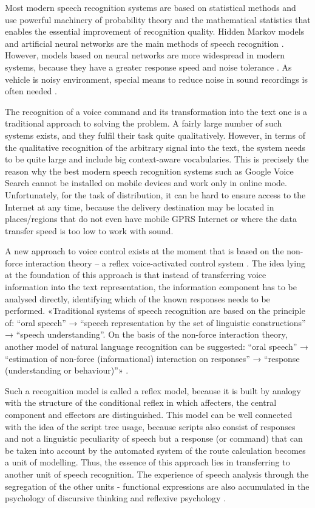 \documentclass[review,authoryear]{elsarticle}
\begin{document}
Most modern speech recognition systems are based on statistical methods and use powerful machinery of probability theory and the mathematical statistics that enables the essential improvement of recognition quality. Hidden Markov models and artificial neural networks are the main methods of speech recognition \citep{eng_Makovkin_2006,eng_Gefke_2012}. However, models based on neural networks are more widespread in modern systems, because they have a greater response speed and noise tolerance \citep{Hinton_2012}. As vehicle is noisy environment, special means to reduce noise in sound recordings is often needed \citep{Ayllon_2014}.

The recognition of a voice command and its transformation into the text one is a traditional approach to solving the problem. A fairly large number of such systems exists, and they fulfil their task quite qualitatively. However, in terms of the qualitative recognition of the arbitrary signal into the text, the system needs to be quite large and include big context-aware vocabularies. This is precisely the reason why the best modern speech recognition systems such as Google Voice Search cannot be installed on mobile devices and work only in online mode. Unfortunately, for the task of distribution, it can be hard to ensure access to the Internet at any time, because the delivery destination may be located in places/regions that do not even have mobile GPRS Internet or where the data transfer speed is too low to work with sound. 

A new approach to voice control exists at the moment that is based on the non-force interaction theory \citep{eng_Teslia_2010} – a reflex voice-activated control system  \citep{eng_Egorchenkov_2016}. The idea lying at the foundation of this approach is that instead of transferring voice information into the text representation, the information component has to be analysed directly, identifying which of the known responses needs to be performed. «Traditional systems of speech recognition are based on the principle of: “oral speech” → “speech representation by the set of linguistic constructions” → “speech understanding”. On the basis of the non-force interaction theory, another model of natural language recognition can be suggested: “oral speech” → “estimation of non-force (informational) interaction on responses” → “response (understanding or behaviour)”» \citep{Teslia_2014}. 

Such a recognition model is called a reflex model, because it is built by analogy with the structure of the conditional reflex in which affecters, the central component and effectors are distinguished. This model can be well connected with the idea of the script tree usage, because scripts also consist of responses and not a linguistic peculiarity of speech but a response (or command) that can be taken into account by the automated system of the route calculation becomes a unit of modelling. Thus, the essence of this approach lies in transferring to another unit of speech recognition. The experience of speech analysis through the segregation of the other units - functional expressions are also accumulated in the psychology of discursive thinking and reflexive psychology \citep{eng_Naydonov_2008}. 
\end{document}
